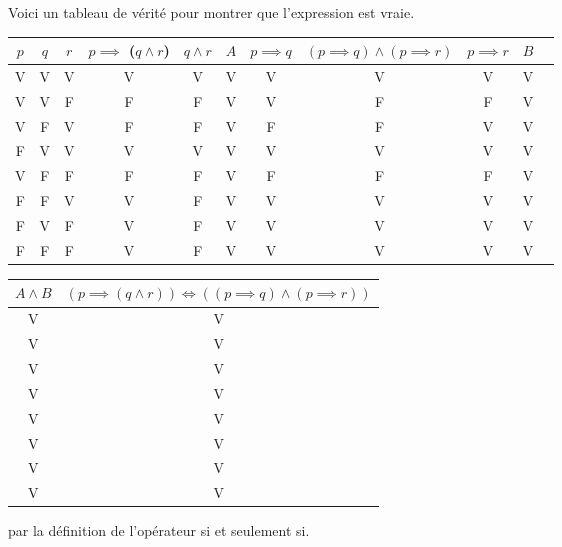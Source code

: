 \documentclass{article}
\begin{document}
Voici un tableau de vérité pour montrer que l'expression est vraie.

\begin{center}
\begin{tabular}{| c | c | c | c | c | c | c | c | c | c | c |}
\hline
$p$ & $q$ & $r$ & $p \implies$ ($q \land r$) & $q \land r$ & $ A $& $p \implies q  $ & $ (p \implies q) \land (p \implies r) $ & $p \implies r $ & $ B $\\
\hline
V & V & V & V & V & V & V & V & V & V\\
V & V & F & F & F & V & V & F & F & V\\
V & F & V & F & F & V & F & F & V & V\\
F & V & V & V & V & V & V & V & V & V\\
V & F & F & F & F & V & F & F & F & V\\
F & F & V & V & F & V & V & V & V & V\\
F & V & F & V & F & V & V & V & V & V\\
F & F & F & V & F & V & V & V & V & V\\
\hline
\end{tabular}
\end{center}

\begin{center}
\begin{tabular}{| c | c |}
\hline
$ A \land B$ & $(p \implies (q \land r)) \iff ((p \implies q) \land (p \implies r))$\\
\hline
V & V \\
V & V \\
V & V \\
V & V \\
V & V \\
V & V \\
V & V \\
V & V \\
\hline
\end{tabular}
\end{center}

par la définition de l’opérateur si et seulement si.
\end{document}
